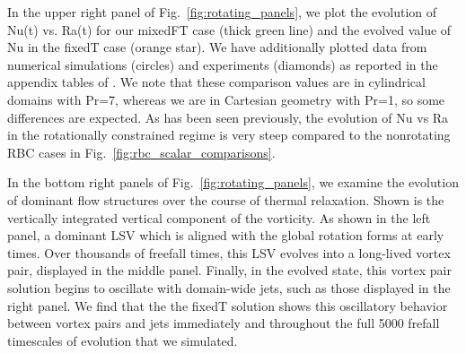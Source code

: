 \documentclass[aps, pre, onecolumn, nofootinbib, notitlepage, groupedaddress, amsfonts, amssymb, amsmath, longbibliography]{revtex4-1}
\begin{document}
In the upper right panel of Fig.~\ref{fig:rotating_panels}, we plot the evolution of Nu(t) vs. Ra(t) for our mixedFT case (thick green line) and the evolved value of Nu in the fixedT case (orange star).
We have additionally plotted data from numerical simulations (circles) and experiments (diamonds) as reported in the appendix tables of \cite{cheng&all2015}.
We note that these comparison values are in cylindrical domains with Pr=7, whereas we are in Cartesian geometry with Pr=1, so some differences are expected.
As has been seen previously, the evolution of Nu vs Ra in the rotationally constrained regime is very steep compared to the nonrotating RBC cases in Fig.~\ref{fig:rbc_scalar_comparisons}.

In the bottom right panels of Fig.~\ref{fig:rotating_panels}, we examine the evolution of dominant flow structures over the course of thermal relaxation.
Shown is the vertically integrated vertical component of the vorticity.
As shown in the left panel, a dominant LSV which is aligned with the global rotation forms at early times.
Over thousands of freefall times, this LSV evolves into a long-lived vortex pair, displayed in the middle panel.
Finally, in the evolved state, this vortex pair solution begins to oscillate with domain-wide jets, such as those displayed in the right panel.
We find that the the fixedT solution shows this oscillatory behavior between vortex pairs and jets immediately and throughout the full 5000 frefall timescales of evolution that we simulated.
\end{document}

